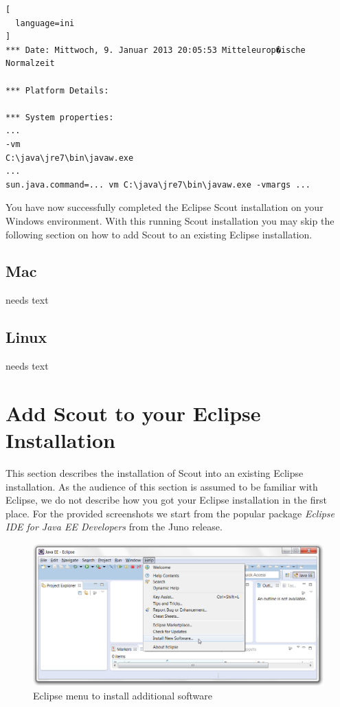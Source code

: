 \documentclass[a4paper,10pt,twoside]{book}
\begin{document}
\begin{lstlisting}[
  language=ini
]
*** Date: Mittwoch, 9. Januar 2013 20:05:53 Mitteleurop�ische Normalzeit

*** Platform Details:

*** System properties:
...
-vm
C:\java\jre7\bin\javaw.exe
...
sun.java.command=... vm C:\java\jre7\bin\javaw.exe -vmargs ...
\end{lstlisting}

You have now successfully completed the Eclipse Scout installation on your Windows environment.
With this running Scout installation you may skip the following section on how to add Scout to an existing Eclipse installation.

\subsection{Mac}
needs text

\subsection{Linux}
needs text

\section{Add Scout to your Eclipse Installation}

This section describes the installation of Scout into an existing Eclipse installation.
As the audience of this section is assumed to be familiar with Eclipse, we do not describe how you got your Eclipse installation in the first place.
For the provided screenshots we start from the popular package \textit{Eclipse IDE for Java EE Developers} from the Juno release.

\begin{figure}
\includegraphics[width=13cm]{eclipse_install_new_software.png}
\caption{Eclipse menu to install additional software}
\end{figure}
\end{document}

